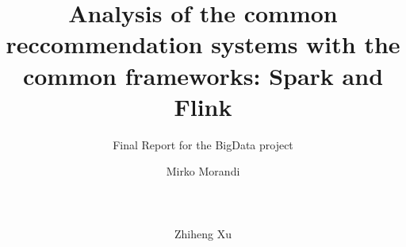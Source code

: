 \documentclass{sig-alternate-05-2015}
\begin{document}



\title {Analysis of the common reccommendation systems with the common frameworks: Spark and Flink}
\subtitle{ Final Report for the BigData project}
%
%
%
%
%

%
\author{
%
%
\alignauthor
Mirko Morandi\\
       \\
       \\
       \\
\alignauthor
Zhiheng Xu\\
        \\
        \\
        \\
}
\end{document}
